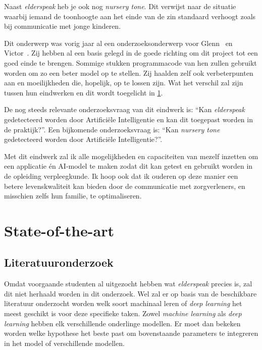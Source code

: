 Naast \textit{elderspeak} heb je ook nog \textit{nursery tone}. Dit verwijst naar de situatie waarbij iemand de toonhoogte aan het einde van de zin standaard verhoogt zoals bij communicatie met jonge kinderen.

Dit onderwerp was vorig jaar al een onderzoeksonderwerp voor Glenn~\textcite{Beeckman2021} en Victor~\textcite{Standaert2021}.
Zij hebben al een basis gelegd in de goede richting om dit project tot een goed einde te brengen.
Sommige stukken programmacode van hen zullen gebruikt worden om zo een beter model op te stellen.
Zij haalden zelf ook verbeterpunten aan en moeilijkheden die, hopelijk, op te lossen zijn. Wat het verschil zal zijn tussen hun eindwerken en dit wordt toegelicht in \ref{sec:state-of-the-art}.

De nog steeds relevante onderzoeksvraag van dit eindwerk is: ``Kan \textit{elderspeak} gedetecteerd worden door Artificiële Intelligentie en kan dit toegepast worden in de praktijk?''. Een bijkomende onderzoeksvraag is: ``Kan \textit{nursery tone} gedetecteerd worden door Artificiële Intelligentie?''.

Met dit eindwerk zal ik alle mogelijkheden en capaciteiten van mezelf inzetten om een applicatie én AI-model te maken zodat dit kan getest en gebruikt worden in de opleiding verpleegkunde.
Ik hoop ook dat ik ouderen op deze manier een betere levenskwaliteit kan bieden door de communicatie met zorgverleners, en misschien zelfs hun familie, te optimaliseren.



\section{State-of-the-art}
\label{sec:state-of-the-art}

\subsection{Literatuuronderzoek}\label{subsec:literatuuronderzoek}

Omdat voorgaande studenten al uitgezocht hebben wat \textit{elderspeak} precies is, zal dit niet herhaald worden in dit onderzoek.
Wel zal er op basis van de beschikbare literatuur onderzocht worden welk soort machinaal leren of \textit{deep learning} het meest geschikt is voor deze specifieke taken. Zowel \textit{machine learning} als \textit{deep learning} hebben elk verschillende onderlinge modellen. Er moet dan bekeken worden welke hypothese het beste past om bovenstaande parameters te integreren in het model of verschillende modellen.

